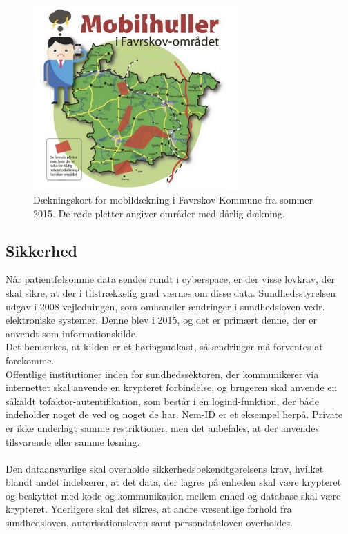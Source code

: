 \begin{figure}[H]
\centering
\includegraphics[width=0.7\textwidth]{Figurer/daekningskort.png}
\caption{\label{fig:dkort}Dækningskort for mobildækning i Favrskov Kommune fra sommer 2015. De røde pletter angiver områder med dårlig dækning\cite{daekningskort}.}
\end{figure}
\subsection{Sikkerhed}
Når patientfølsomme data sendes rundt i cyberspace, er der visse lovkrav, der skal sikre, at der i tilstrækkelig grad værnes om disse data.
Sundhedsstyrelsen udgav i 2008 vejledningen, som omhandler ændringer i sundhedsloven vedr. elektroniske systemer. Denne blev i 2015, og det er primært denne, der er anvendt som informationskilde\cite{vogi}.\\Det bemærkes, at kilden er et høringsudkast, så ændringer må forventes at forekomme.\\
Offentlige institutioner inden for sundhedssektoren, der kommunikerer via internettet skal anvende en krypteret forbindelse, og brugeren skal anvende en såkaldt tofaktor-autentifikation, som består i en logind-funktion, der både indeholder noget de ved og noget de har. Nem-ID er et eksempel herpå. Private er ikke underlagt samme restriktioner, men det anbefales, at der anvendes tilsvarende eller samme løsning.\\ \\
Den dataansvarlige skal overholde sikkerhedsbekendtgørelsens krav, hvilket blandt andet indebærer, at det data, der lagres på enheden skal være krypteret og beskyttet med kode og kommunikation mellem enhed og database skal være krypteret\cite{shbekendt}. Yderligere skal det sikres, at andre væsentlige forhold fra sundhedsloven, autorisationsloven samt persondataloven overholdes. 

